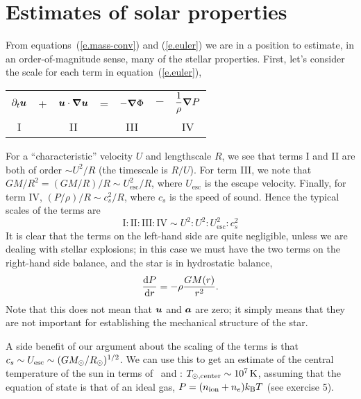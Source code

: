\section{Estimates of solar properties}

From equations~(\ref{e.mass-conv}) and (\ref{e.euler}) we are in a position to estimate, in an order-of-magnitude sense, many of the stellar properties.  First, let's consider the scale for each term in equation~(\ref{e.euler}),
\begin{center}\begin{tabular}{ccccccc}
$\displaystyle \partial_{t}\boldsymbol{u}$ & + &
$\displaystyle  \boldsymbol{u}\cdot\boldsymbol{\nabla}\boldsymbol{u}$ & = &
$\displaystyle -\boldsymbol{\nabla} \Phi $ & $-$ & 
$\displaystyle \frac{1}{\rho}\boldsymbol{\nabla} P$\\
I & & II & & III & & IV
\end{tabular}
\end{center}
For a ``characteristic'' velocity $U$ and lengthscale $R$, we see that terms I and II are both of order $\sim U^{2}/R$ (the timescale is $R/U$).  For term III, we note that $GM/R^{2} = (GM/R)/R \sim U_{\mathrm{esc}}^{2}/R$, where $U_{\mathrm{esc}}$ is the escape velocity.  Finally, for term IV, $(P/\rho)/R \sim c_{s}^{2}/R$, where $c_{s}$ is the speed of sound.  Hence the typical scales of the terms are
\[
\textrm{I} : \textrm{II} : \textrm{III} : \textrm{IV} \sim U^{2} : U^{2} : U_{\mathrm{esc}}^{2} : c_{s}^{2}
\]
It is clear that the terms on the left-hand side are quite negligible, unless we are dealing with stellar explosions; in this case we must have the two terms on the right-hand side balance, and the star is in hydrostatic balance, 
\begin{equation}\label{e.hydrostatic}
\frac{\mathrm{d} P}{\mathrm{d} r} = -\rho \frac{GM(r)}{r^{2}}.
\end{equation}
Note that this does not mean that $\boldsymbol{u}$ and $\boldsymbol{a}$ are zero; it simply means that they are not important for establishing the mechanical structure of the star.

A side benefit of our argument about the scaling of the terms is that $c_{s}\sim U_{\mathrm{esc}} \sim (GM_\odot/R_{\odot})^{1/2}$.  We can use this to get an estimate of the central temperature of the sun in terms of \Msun\ and \Rsun: $T_{\odot,\mathrm{center}}\sim 10^{7}\,\mathrm{K}$, assuming that the equation of state is that of an ideal gas, $P = (n_{\mathrm{ion}} + n_{e})k_\mathrm{B} T$ (see exercise 5). 

